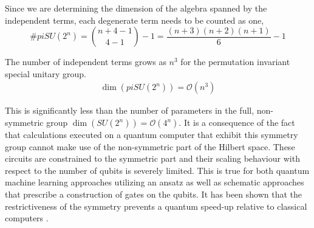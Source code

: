 \documentclass[%
 reprint,
 amsmath,amssymb,
 aps,
]{revtex4-2}
\theoremstyle{definition}%
\begin{document}
Since we are determining the dimension of the algebra spanned by the independent terms, each degenerate term needs to be counted as one,
\begin{equation}
    \#piSU(2^n)=\binom{n+4-1}{4-1} - 1=\frac{(n+3)(n+2)(n+1)}{6} - 1
\end{equation}

The number of independent terms grows as $n^3$ for the permutation invariant special unitary group. 
\begin{align}
    \dim(piSU(2^n)) = \mathcal{O}(n^3)
\end{align}

This is significantly less than the number of parameters in the full, non-symmetric group $\dim(SU(2^n)) = \mathcal{O}(4^n)$. It is a consequence of the fact that calculations executed on a quantum computer that exhibit this symmetry group cannot make use of the non-symmetric part of the Hilbert space. These circuits are constrained to the symmetric part and their scaling behaviour with respect to the number of qubits is severely limited. This is true for both quantum machine learning approaches utilizing an ansatz as well as schematic approaches that prescribe a construction of gates on the qubits. It has been shown that the restrictiveness of the symmetry prevents a quantum speed-up relative to classical computers \cite{ben-david_symmetries_2020}.




\end{document}
